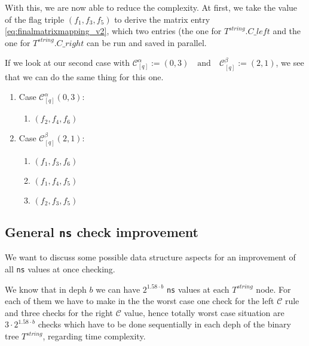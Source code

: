 \documentclass{article}
\newtheorem*{theorem A}{Theorem A}
\newtheorem*{theorem B}{N\"olker's Theorem}
\theoremstyle{remark}
\theoremstyle{remark}
\begin{document}
With this, we are now able to reduce the complexity. At first, we take the value of the flag triple $\left(f_{1}, f_{3}, f_{5}\right)$ to derive the matrix entry \ref{eq:finalmatrixmapping_v2}, which two entries (the one for $T^{string}.C\_left$ and the one for $T^{string}.C\_right$ can be run and saved in parallel.

If we look at our second case with $\mathcal{C}^{\alpha}_{[q]} := \left(0,3\right) \quad \mathrm{and} \quad \mathcal{C}^{\beta}_{[q]} := \left(2,1\right)$, we see that we can do the same thing for this one.

\begin{enumerate}
    \item Case $\mathcal{C}^{\alpha}_{[q]}\left(0,3\right)$:
        \begin{enumerate}
            \item $\left(f_{2}, f_{4}, f_{6}\right)$
        \end{enumerate}

    \item Case $\mathcal{C}^{\beta}_{[q]}\left(2,1\right)$:
        \begin{enumerate}
            \item $\left(f_{1}, f_{3}, f_{6}\right)$
            \item $\left(f_{1}, f_{4}, f_{5}\right)$
            \item $\left(f_{2}, f_{3}, f_{5}\right)$
        \end{enumerate}
\end{enumerate}
\subsection{General \texttt{ns} check improvement}
\label{ss:generalnscheckimprovement}
We want to discuss some possible data structure aspects for an improvement of all \texttt{ns} values at once checking.

We know that in deph $b$ we can have $2^{1.58 \cdot b}$ \texttt{ns} values at each $T^{string}$ node. For each of them we have to make in the the worst case one check for the left $\mathcal{C}$ rule and three checks for the right $\mathcal{C}$ value, hence totally worst case situation are $3 \cdot 2^{1.58 \cdot b}$ checks which have to be done sequentially in each deph of the binary tree $T^{string}$, regarding time complexity.
\end{document}
